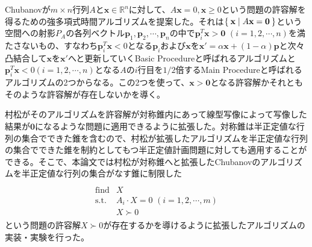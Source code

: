 Chubanovが$m \times n$行列$A$と$\mathbf{x} \in \mathbb{R}^n$に対して、$A \mathbf{x} = 0, \mathbf{x} \geq 0$という問題の許容解を得るための強多項式時間アルゴリズムを提案した。それは$\Set{\mathbf{x} | A \mathbf{x} = \mathbf{0}}$という空間への射影$P_A$の各列ベクトル$\mathbf{p}_1, \mathbf{p}_2, \cdots, \mathbf{p}_n$の中で$\mathbf{p}_i^T \mathbf{x} > \mathbf{0} \,\, (i = 1, 2, \cdots, n)$を満たさないもの、すなわち$\mathbf{p}_i^T \mathbf{x} < 0$となる$\mathbf{p}_i$および$\mathbf{x}$を$\mathbf{x}' = \alpha \mathbf{x} + (1 - \alpha) \mathbf{p}$と次々凸結合して$\mathbf{x}$を$\mathbf{x}'$へと更新していくBasic Procedureと呼ばれるアルゴリズムと$\mathbf{p}_i^T \mathbf{x} < 0 (i = 1, 2, \cdots, n)$となる$A$の$i$行目を$1 / 2$倍するMain Procedureと呼ばれるアルゴリズムの2つからなる。この2つを使って、$\mathbf{x} > \mathbf{0}$となる許容解かそれともそのような許容解が存在しないかを導く。

村松がそのアルゴリズムを許容解が対称錐内にあって線型写像によって写像した結果が$\mathbf{0}$になるような問題に適用できるように拡張した。対称錐は半正定値な行列の集合でできた錐を含むので、村松が拡張したアルゴリズムを半正定値な行列の集合でできた錐を制約としてもつ半正定値計画問題に対しても適用することができる。そこで、本論文では村松が対称錐へと拡張したChubanovのアルゴリズムを半正定値な行列の集合がなす錐に制限した
\begin{align*}
  \begin{array}{ll} \\
    \text{find} & X \\
    \text{s.t.} & A_i \cdot X = 0 \,\, (i = 1, 2, \cdots, m) \\
                & X \succ 0
  \end{array}
\end{align*}
という問題の許容解$X \succ 0$が存在するかを導けるように拡張したアルゴリズムの実装・実験を行った。
